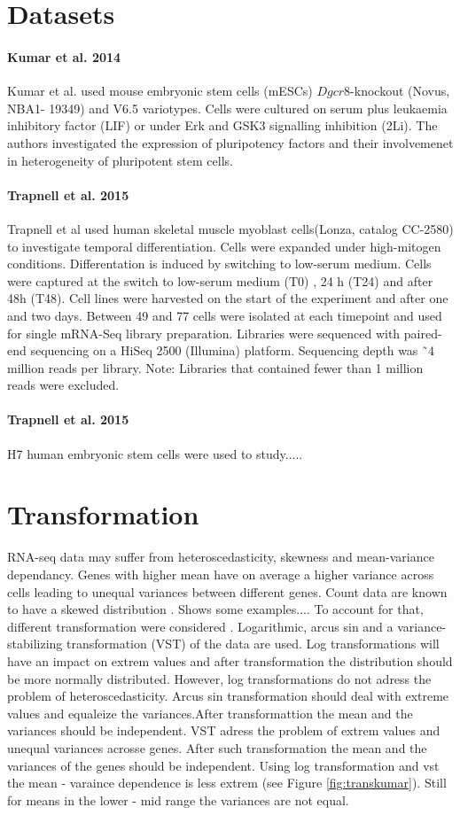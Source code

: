 \documentclass{article}\usepackage[]{graphicx}\usepackage[]{color}
\begin{document}
\section{Datasets}
\paragraph{Kumar et al. 2014} 
Kumar et al. used mouse embryonic stem cells (mESCs) $Dgcr8$-knockout (Novus, NBA1- 19349) and V6.5 variotypes. Cells were cultured on serum plus leukaemia inhibitory factor (LIF) or under Erk and GSK3 signalling inhibition (2Li). The authors investigated the expression of pluripotency factors and their involvemenet in heterogeneity of pluripotent stem cells.
\paragraph{Trapnell et al. 2015} 
Trapnell et al used human skeletal muscle myoblast cells(Lonza, catalog CC-2580) to investigate temporal differentiation. Cells were expanded under high-mitogen conditions. Differentation is induced by switching to low-serum medium. Cells were captured at the switch to low-serum medium (T0) , 24 h (T24) and after 48h (T48). Cell lines were harvested on the start of the experiment and after one and two days. Between 49 and 77 cells were isolated at each timepoint and used for single mRNA-Seq library preparation. Libraries were sequenced with paired-end sequencing on a HiSeq 2500 (Illumina) platform. Sequencing depth was ˜4 million reads per library. Note: Libraries that contained fewer than 1 million reads were excluded.
\paragraph{Trapnell et al. 2015} 
H7 human embryonic stem cells were used to study.....
\section{Transformation}
RNA-seq data may suffer from heteroscedasticity, skewness and mean-variance dependancy. Genes with higher mean have on average a higher variance across cells leading to unequal variances between different genes. Count data are known to have a skewed distribution . Shows some examples....
To account for that, different transformation were considered . Logarithmic, arcus sin and a variance-stabilizing transformation (VST) of the data are used. Log transformations will have an impact on extrem values and after transformation the distribution should be more normally distributed. However, log transformations do not adress the problem of heteroscedasticity. Arcus sin transformation should deal with extreme values and equaleize the variances.After transformattion the mean and the variances should be independent. VST adress the problem of extrem values and unequal variances acrosse genes. After such transformation the mean and the variances of the genes should be independent. Using log transformation and vst the mean - varaince dependence is less extrem (see Figure \ref{fig:transkumar}). Still for means in the lower - mid range the variances are not equal. 
\end{document}
